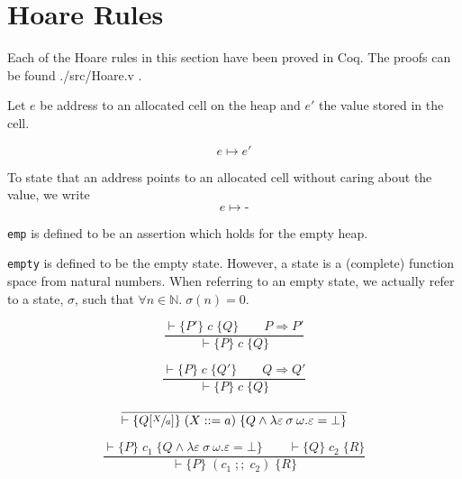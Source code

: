 
\section{Hoare Rules}

Each of the Hoare rules in this section have been proved in Coq. The proofs can be found ./src/Hoare.v .

\begin{defn}

Let $e$ be address to an allocated cell on the heap and $e'$ the value stored in the cell.

\begin{equation}
e \mapsto e'
\end{equation}

To state that an address points to an allocated cell without caring about the value, we write
\begin{equation}
e \mapsto \textbf{-}
\end{equation}

\end{defn}

\begin{defn}
\verb|emp| is defined to be an assertion which holds for the empty heap.

\verb|empty| is defined to be the empty state. However, a state is a (complete) function space from natural numbers. When referring to an empty state, we actually refer to a state, $\sigma$, such that $\forall n \in \mathbb{N}.\; \sigma(n) = 0$.
\end{defn}

\begin{equation}\label{eqn:hoare-cons-pre}
\frac{\vdash\{P'\} \; c \; \{Q\} \qquad P \Rightarrow P'}{\vdash\{P\} \; c \; \{Q\}}
\end{equation}

\begin{equation}\label{eqn:hoare-cons-post}
\frac{\vdash\{P\} \; c \; \{Q'\} \qquad Q \Rightarrow Q'}{\vdash\{P\} \; c \; \{Q\}}
\end{equation}

\begin{equation}\label{eqn:hoare-assign}
\frac{}{\vdash \{Q[\sfrac{X}{a}]\} \; (X ::= a) \; \{Q \wedge \lambda \varepsilon\:\sigma\:\omega. \varepsilon = \bot\}}
\end{equation}

\begin{equation}\label{eqn:hoare-seq}
\frac{\vdash \{P\} \; c_1 \; \{Q \wedge \lambda \varepsilon\:\sigma\:\omega. \varepsilon = \bot\} \qquad \vdash \{Q\} \; c_2 \; \{R\}}{\vdash \{P\} \; (c_1\; ;;\; c_2) \; \{R\}}
\end{equation}


